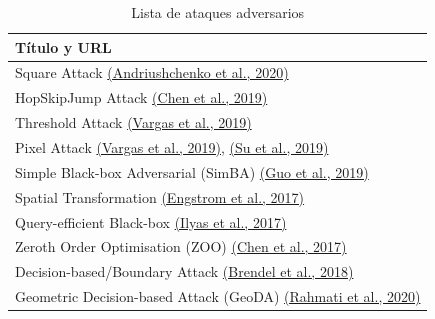 \begin{table}[H]
    \centering
    \footnotesize
    \begin{tabularx}{\linewidth}{|X|}\hline
        \textbf{Título y URL}                                                                                                                                                  \\ \hline
        Square Attack \href{https://arxiv.org/abs/1912.00049}{(Andriushchenko et al., 2020)}                                                                                   \\ \hline
        HopSkipJump Attack \href{https://arxiv.org/abs/1904.02144}{(Chen et al., 2019)}                                                                                        \\ \hline
        Threshold Attack \href{https://arxiv.org/abs/1906.06026}{(Vargas et al., 2019)}                                                                                        \\ \hline
        Pixel Attack \href{https://arxiv.org/abs/1906.06026}{(Vargas et al., 2019)}, \href{https://ieeexplore.ieee.org/abstract/document/8601309/citations}{(Su et al., 2019)} \\ \hline
        Simple Black-box Adversarial (SimBA) \href{https://arxiv.org/abs/1905.07121}{(Guo et al., 2019)}                                                                       \\ \hline
        Spatial Transformation \href{https://arxiv.org/abs/1712.02779}{(Engstrom et al., 2017)}                                                                                \\ \hline
        Query-efficient Black-box \href{https://arxiv.org/abs/1712.07113}{(Ilyas et al., 2017)}                                                                                \\ \hline
        Zeroth Order Optimisation (ZOO) \href{https://arxiv.org/abs/1708.03999}{(Chen et al., 2017)}                                                                           \\ \hline
        Decision-based/Boundary Attack \href{https://arxiv.org/abs/1712.04248}{(Brendel et al., 2018)}                                                                         \\ \hline
        Geometric Decision-based Attack (GeoDA) \href{https://arxiv.org/abs/2003.06468}{(Rahmati et al., 2020)}                                                                \\ \hline
    \end{tabularx}
    \caption{Lista de ataques adversarios}
    \label{tab:my-table-black-box}
\end{table}

